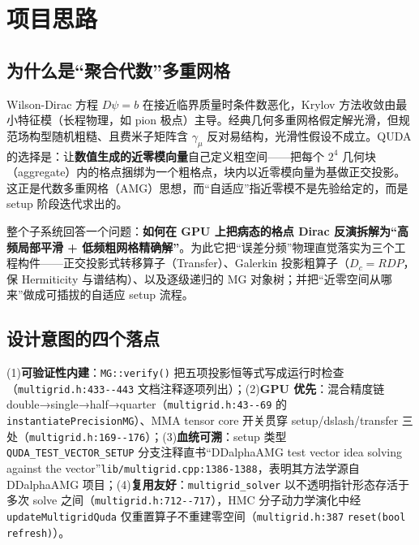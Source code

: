 \documentclass[UTF8]{ctexart}
\begin{document}
\section{项目思路}

\subsection{为什么是``聚合代数''多重网格}

Wilson-Dirac 方程 $D\psi=b$ 在接近临界质量时条件数恶化，Krylov 方法收敛由最小特征模（长程物理，如 pion 极点）主导。经典几何多重网格假定解光滑，但规范场构型随机粗糙、且费米子矩阵含 $\gamma_\mu$ 反对易结构，光滑性假设不成立。QUDA 的选择是：让\textbf{数值生成的近零模向量}自己定义粗空间——把每个 $2^4$ 几何块（aggregate）内的格点捆绑为一个粗格点，块内以近零模向量为基做正交投影。这正是代数多重网格（AMG）思想，而``自适应''指近零模不是先验给定的，而是 setup 阶段迭代求出的。

\begin{ideabox}
整个子系统回答一个问题：\textbf{如何在 GPU 上把病态的格点 Dirac 反演拆解为``高频局部平滑 + 低频粗网格精确解''}。为此它把``误差分频''物理直觉落实为三个工程构件——正交投影式转移算子（Transfer）、Galerkin 投影粗算子（$D_c=RDP$，保 Hermiticity 与谱结构）、以及逐级递归的 MG 对象树；并把``近零空间从哪来''做成可插拔的自适应 setup 流程。
\end{ideabox}

\subsection{设计意图的四个落点}

(1)\textbf{可验证性内建}：\texttt{MG::verify()} 把五项投影恒等式写成运行时检查（\textcolor{evidence}{\texttt{\nolinkurl{multigrid.h:433--443}}} 文档注释逐项列出）；(2)\textbf{GPU 优先}：混合精度链 double→single→half→quarter（\textcolor{evidence}{\texttt{\nolinkurl{multigrid.h:43--69}}} 的 \texttt{instantiatePrecisionMG}）、MMA tensor core 开关贯穿 setup/dslash/transfer 三处（\textcolor{evidence}{\texttt{\nolinkurl{multigrid.h:169--176}}}）；(3)\textbf{血统可溯}：setup 类型 \texttt{QUDA\_TEST\_VECTOR\_SETUP} 分支注释直书``DDalphaAMG test vector idea solving against the vector''\textcolor{evidence}{\texttt{\nolinkurl{lib/multigrid.cpp:1386-1388}}}，表明其方法学源自 DDalphaAMG 项目；(4)\textbf{复用友好}：\texttt{multigrid\_solver} 以不透明指针形态存活于多次 solve 之间（\textcolor{evidence}{\texttt{\nolinkurl{multigrid.h:712--717}}}），HMC 分子动力学演化中经 \texttt{updateMultigridQuda} 仅重置算子不重建零空间（\textcolor{evidence}{\texttt{\nolinkurl{multigrid.h:387}}} \texttt{reset(bool refresh)}）。
\end{document}
